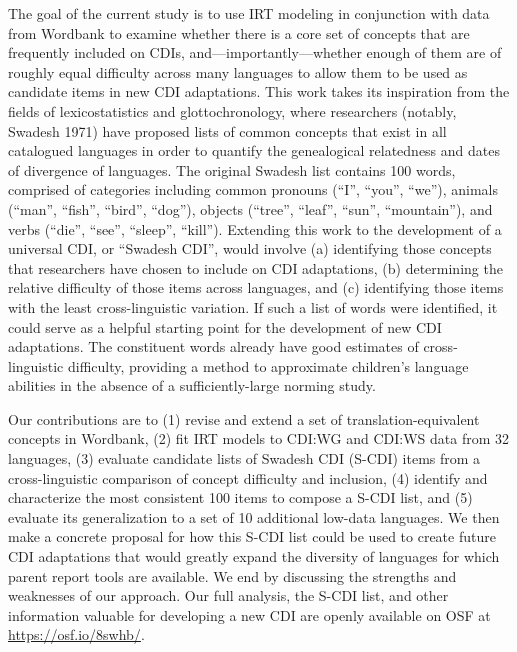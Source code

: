 \documentclass[
  letterpaper,
  DIV=11,
  numbers=noendperiod]{scrartcl}
\begin{document}
The goal of the current study is to use IRT modeling in conjunction with
data from Wordbank to examine whether there is a core set of concepts
that are frequently included on CDIs, and---importantly---whether enough
of them are of roughly equal difficulty across many languages to allow
them to be used as candidate items in new CDI adaptations. This work
takes its inspiration from the fields of lexicostatistics and
glottochronology, where researchers (notably, Swadesh 1971) have
proposed lists of common concepts that exist in all catalogued languages
in order to quantify the genealogical relatedness and dates of
divergence of languages. The original Swadesh list contains 100 words,
comprised of categories including common pronouns (``I'', ``you'',
``we''), animals (``man'', ``fish'', ``bird'', ``dog''), objects
(``tree'', ``leaf'', ``sun'', ``mountain''), and verbs (``die'',
``see'', ``sleep'', ``kill''). Extending this work to the development of
a universal CDI, or ``Swadesh CDI'', would involve (a) identifying those
concepts that researchers have chosen to include on CDI adaptations, (b)
determining the relative difficulty of those items across languages, and
(c) identifying those items with the least cross-linguistic variation.
If such a list of words were identified, it could serve as a helpful
starting point for the development of new CDI adaptations. The
constituent words already have good estimates of cross-linguistic
difficulty, providing a method to approximate children's language
abilities in the absence of a sufficiently-large norming study.

Our contributions are to (1) revise and extend a set of
translation-equivalent concepts in Wordbank, (2) fit IRT models to
CDI:WG and CDI:WS data from 32 languages, (3) evaluate candidate lists
of Swadesh CDI (S-CDI) items from a cross-linguistic comparison of
concept difficulty and inclusion, (4) identify and characterize the most
consistent 100 items to compose a S-CDI list, and (5) evaluate its
generalization to a set of 10 additional low-data languages. We then
make a concrete proposal for how this S-CDI list could be used to create
future CDI adaptations that would greatly expand the diversity of
languages for which parent report tools are available. We end by
discussing the strengths and weaknesses of our approach. Our full
analysis, the S-CDI list, and other information valuable for developing
a new CDI are openly available on OSF at
\href{https://osf.io/8swhb/?view_only=6f6ab9818f2a4bb288e05ca9e12f540c}{https://osf.io/8swhb/}.
\end{document}
